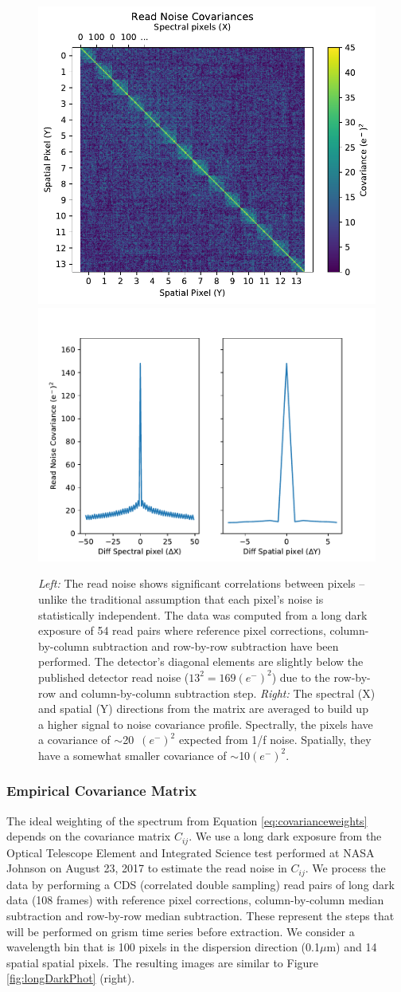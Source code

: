 \documentclass[]{aastex62}
\begin{document}
\begin{figure}[!hbtp]
\centering
\includegraphics[width=.49\columnwidth]{spec_spatial_cov.pdf}
\includegraphics[width=.49\columnwidth]{cross_sections_cov.pdf}
\caption{{\it Left:} The read noise shows significant correlations between pixels -- unlike the traditional assumption that each pixel's noise is statistically independent.
The data was computed from a long dark exposure of 54 read pairs where reference pixel corrections, column-by-column subtraction and row-by-row subtraction have been performed.
The detector's diagonal elements are slightly below the published detector read noise ($13^2 = 169 (e^-)^2$) due to the row-by-row and column-by-column subtraction step.
{\it Right:} The spectral (X) and spatial (Y) directions from the matrix are averaged to build up a higher signal to noise covariance profile.
Spectrally, the pixels have a covariance of $\sim$20~$(e^-)^2$ expected from 1/f noise. Spatially, they have a somewhat smaller covariance of $\sim$10$(e^-)^2$.}\label{fig:covSpecSpatial}
\end{figure}

\subsubsection{Empirical Covariance Matrix}\label{sec:empCovarianceMatrix}
The ideal weighting of the spectrum from Equation \ref{eq:covarianceweights} depends on the covariance matrix $C_{ij}$.
We use a long dark exposure from the Optical Telescope Element and Integrated Science test performed at NASA Johnson on August 23, 2017 to estimate the read noise in $C_{ij}$.
We process the data by performing a CDS (correlated double sampling) read pairs of long dark data (108 frames) with reference pixel corrections, column-by-column median subtraction and row-by-row median subtraction.
These represent the steps that will be performed on grism time series before extraction.
We consider a wavelength bin that is 100 pixels in the dispersion direction (0.1$\mu$m) and 14 spatial spatial pixels.
The resulting images are similar to Figure \ref{fig:longDarkPhot} (right).
\end{document}
